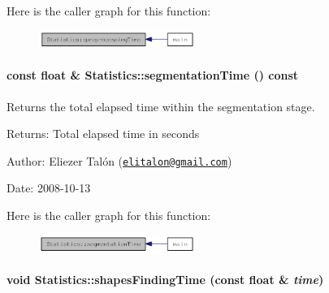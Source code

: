 Here is the caller graph for this function:\nopagebreak
\begin{figure}[H]
\begin{center}
\leavevmode
\includegraphics[width=144pt]{class_statistics_96aafebb86be480130007bd437875156_icgraph}
\end{center}
\end{figure}
\hypertarget{class_statistics_4cea19c3705fc315ce2b4300b3725ab8}{
\paragraph[{segmentationTime}]{\setlength{\rightskip}{0pt plus 5cm}const float \& Statistics::segmentationTime () const}\hfill}
\label{class_statistics_4cea19c3705fc315ce2b4300b3725ab8}


Returns the total elapsed time within the segmentation stage. 

\begin{Desc}
\item[Returns:]Total elapsed time in seconds\end{Desc}
\begin{Desc}
\item[Author:]Eliezer Talón (\href{mailto:elitalon@gmail.com}{\tt elitalon@gmail.com}) \end{Desc}
\begin{Desc}
\item[Date:]2008-10-13 \end{Desc}


Here is the caller graph for this function:\nopagebreak
\begin{figure}[H]
\begin{center}
\leavevmode
\includegraphics[width=144pt]{class_statistics_4cea19c3705fc315ce2b4300b3725ab8_icgraph}
\end{center}
\end{figure}
\hypertarget{class_statistics_e380b6d86bb2feeaabba147f731aac73}{
\paragraph[{shapesFindingTime}]{\setlength{\rightskip}{0pt plus 5cm}void Statistics::shapesFindingTime (const float \& {\em time})}\hfill}
\label{class_statistics_e380b6d86bb2feeaabba147f731aac73}


